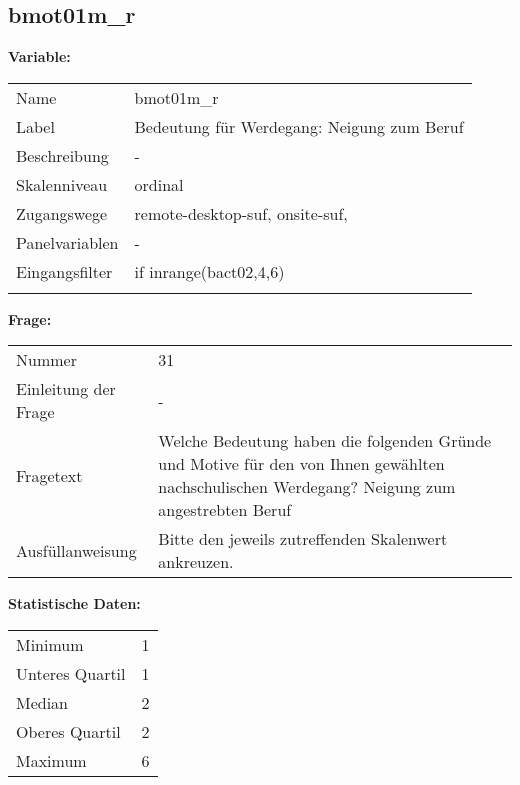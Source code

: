 	
	
	\subsection{bmot01m\_r}
	\label{subSection:bmot01m_r}

	\noindent\textbf{Variable:}\\
		\begin{tabular}{lL{11.3cm}}
			\label{tableVariable:bmot01m_r}
			Name & bmot01m\_r \\
			Label & Bedeutung für Werdegang: Neigung zum Beruf \\
			Beschreibung & - \\
			Skalenniveau & ordinal \\
			Zugangswege &
				remote-desktop-suf,
				onsite-suf,
 \\
			Panelvariablen & -
			 \\
			Eingangsfilter & if inrange(bact02,4,6)  \\
 \\
		\end{tabular}

		\vspace*{1 cm}
		\noindent\textbf{Frage:}\\
		\begin{tabular}{lL{11.3cm}}
			\label{tableQuestion:bmot01m_r}
			Nummer & 31 \\
			Einleitung der Frage & - \\
			Fragetext & Welche Bedeutung haben die folgenden Gründe und Motive für den von Ihnen gewählten nachschulischen Werdegang?
Neigung zum angestrebten Beruf \\
			Ausfüllanweisung & Bitte den jeweils zutreffenden Skalenwert ankreuzen. \\
		\end{tabular}


		\vspace*{1 cm}
		\noindent\textbf{Statistische Daten:}\\
			\begin{tabular}{ll}
				\label{tableStatistics:bmot01m_r}
					Minimum & 1 \\
					Unteres Quartil & 1 \\
					Median & 2 \\
					Oberes Quartil & 2 \\
					Maximum & 6 \\
			\end{tabular}



